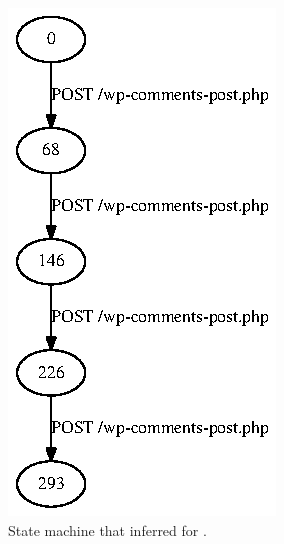 \begin{figure}[tb]
  \centering
  \includegraphics{figures/wordpress.ps}
  \caption{State machine that \crawler{} inferred for \wordpress{}.}
\end{figure}
